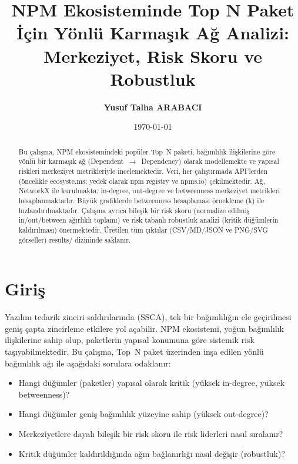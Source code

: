 \documentclass[11pt,a4paper]{article}
\title{NPM Ekosisteminde Top N Paket İçin Yönlü Karmaşık Ağ Analizi: Merkeziyet, Risk Skoru ve Robustluk}
\author{\textbf{Yusuf Talha ARABACI}}
\date{\today}
\begin{document}
\maketitle

\begin{abstract}
Bu çalışma, NPM ekosistemindeki popüler Top~N paketi, bağımlılık ilişkilerine göre yönlü bir karmaşık ağ (Dependent~$\to$~Dependency) olarak modellemekte ve yapısal riskleri merkeziyet metrikleriyle incelemektedir. Veri, her çalıştırmada API'lerden (öncelikle ecosyste.ms; yedek olarak npm registry ve npms.io) çekilmektedir. Ağ, NetworkX ile kurulmakta; in-degree, out-degree ve betweenness merkeziyet metrikleri hesaplanmaktadır. Büyük grafiklerde betweenness hesaplaması örnekleme (k) ile hızlandırılmaktadır. Çalışma ayrıca bileşik bir risk skoru (normalize edilmiş in/out/between ağırlıklı toplamı) ve risk tabanlı robustluk analizi (kritik düğümlerin kaldırılması) önermektedir. Üretilen tüm çıktılar (CSV/MD/JSON ve PNG/SVG görseller) results/ dizininde saklanır.
\end{abstract}

\section{Giriş}
Yazılım tedarik zinciri saldırılarında (SSCA), tek bir bağımlılığın ele geçirilmesi geniş çapta zincirleme etkilere yol açabilir. NPM ekosistemi, yoğun bağımlılık ilişkilerine sahip olup, paketlerin yapısal konumuna göre sistemik risk taşıyabilmektedir. Bu çalışma, Top~N paket üzerinden inşa edilen yönlü bağımlılık ağı ile aşağıdaki sorulara odaklanır:
\begin{itemize}
  \item Hangi düğümler (paketler) yapısal olarak kritik (yüksek in-degree, yüksek betweenness)?
  \item Hangi düğümler geniş bağımlılık yüzeyine sahip (yüksek out-degree)?
  \item Merkeziyetlere dayalı bileşik bir risk skoru ile risk liderleri nasıl sıralanır?
  \item Kritik düğümler kaldırıldığında ağın bağlanırlığı nasıl değişir (robustluk)?
\end{itemize}
\end{document}
